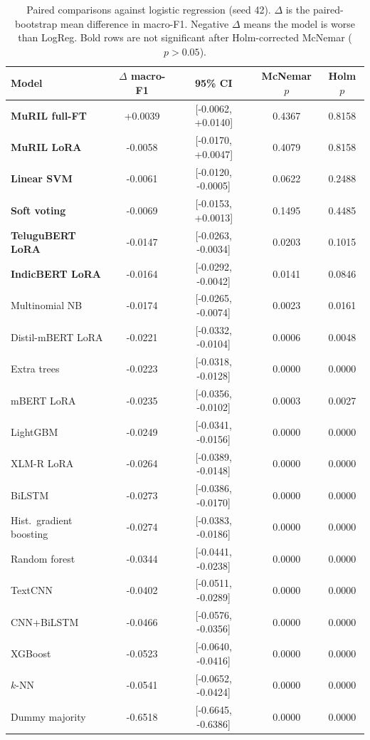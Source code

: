 \documentclass[10pt,journal]{IEEEtran}
\begin{document}
\begin{table}[t]
\caption{Paired comparisons against logistic regression (seed 42). $\Delta$ is the paired-bootstrap mean difference in macro-F1. Negative $\Delta$ means the model is worse than LogReg. Bold rows are not significant after Holm-corrected McNemar ($p>0.05$).}
\label{tab:pairwise}
\centering
\scriptsize
\setlength{\tabcolsep}{9pt}
\begin{tabular}{lcccc}
\toprule
Model & $\Delta$ macro-F1 & 95\% CI & McNemar $p$ & Holm $p$ \\
\midrule
\textbf{MuRIL full-FT}        & +0.0039 & [-0.0062, +0.0140] & 0.4367 & 0.8158 \\
\textbf{MuRIL LoRA}           & -0.0058 & [-0.0170, +0.0047] & 0.4079 & 0.8158 \\
\textbf{Linear SVM}           & -0.0061 & [-0.0120, -0.0005] & 0.0622 & 0.2488 \\
\textbf{Soft voting}          & -0.0069 & [-0.0153, +0.0013] & 0.1495 & 0.4485 \\
\textbf{TeluguBERT LoRA}      & -0.0147 & [-0.0263, -0.0034] & 0.0203 & 0.1015 \\
\textbf{IndicBERT LoRA}       & -0.0164 & [-0.0292, -0.0042] & 0.0141 & 0.0846 \\
Multinomial NB                & -0.0174 & [-0.0265, -0.0074] & 0.0023 & 0.0161 \\
Distil-mBERT LoRA             & -0.0221 & [-0.0332, -0.0104] & 0.0006 & 0.0048 \\
Extra trees                   & -0.0223 & [-0.0318, -0.0128] & 0.0000 & 0.0000 \\
mBERT LoRA                    & -0.0235 & [-0.0356, -0.0102] & 0.0003 & 0.0027 \\
LightGBM                      & -0.0249 & [-0.0341, -0.0156] & 0.0000 & 0.0000 \\
XLM-R LoRA                    & -0.0264 & [-0.0389, -0.0148] & 0.0000 & 0.0000 \\
BiLSTM                        & -0.0273 & [-0.0386, -0.0170] & 0.0000 & 0.0000 \\
Hist.\ gradient boosting      & -0.0274 & [-0.0383, -0.0186] & 0.0000 & 0.0000 \\
Random forest                 & -0.0344 & [-0.0441, -0.0238] & 0.0000 & 0.0000 \\
TextCNN                       & -0.0402 & [-0.0511, -0.0289] & 0.0000 & 0.0000 \\
CNN+BiLSTM                    & -0.0466 & [-0.0576, -0.0356] & 0.0000 & 0.0000 \\
XGBoost                       & -0.0523 & [-0.0640, -0.0416] & 0.0000 & 0.0000 \\
$k$-NN                        & -0.0541 & [-0.0652, -0.0424] & 0.0000 & 0.0000 \\
Dummy majority                & -0.6518 & [-0.6645, -0.6386] & 0.0000 & 0.0000 \\
\bottomrule
\end{tabular}
\end{table}
\end{document}
